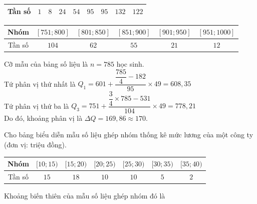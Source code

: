 \begin{ex}
{\begin{center}
\begin{tabular}{|c|c|c|c|c|c|c|c|c|}
		\hline Tần số & $1$ & $8$ & $24$ & $54$ &$95$& $95$ & $132$ & $122$ \\
		\hline
	\end{tabular}
\end{center}
	\begin{center}
	\begin{tabular}{|c|c|c|c|c|c|}
		\hline Nhóm  &	$[751 ; 800]$ &	$[801 ; 850]$& $[851 ; 900]$ & $[901 ; 950]$ &	$[951 ; 1000]$ \\
		\hline Tần số & $104$ &$62$& $55$ & $21$ & $12$ \\
		\hline
	\end{tabular}
\end{center}
Cỡ mẫu của bảng số liệu là $n=785$ học sinh.\\
Tứ phân vị thứ nhất là $Q_1=601+\dfrac{\dfrac{785}{4}-182}{95}\times 49=608{,}35$\\
Tứ phân vị thứ ba là $Q_3=751+\dfrac{\dfrac{3}{4}\times 785-531}{104}\times 49=778{,}21$\\
Do đó, khoảng phân vị là $\Delta Q=169{,}86\approx 170$.

}
\end{ex}
\begin{ex}%
Cho bảng biểu diễn mẫu số liệu ghép nhóm thống kê mức lương của một công ty (đơn vị: triệu đồng).
\begin{center}\begin{tabular}{|c|c|c|c|c|c|c|}
			\hline Nhóm & $[10 ; 15)$ & $[15 ; 20)$ & $[20 ; 25)$ & $[25 ; 30)$ & $[30 ; 35)$ & $[35 ; 40)$  \\
			\hline Tần số & $15$ & $18$ & $10$ &$10$ &$5$ &$2$\\
			\hline
\end{tabular}\end{center}
Khoảng biến thiên của mẫu số liệu ghép nhóm đó là
\end{ex}
